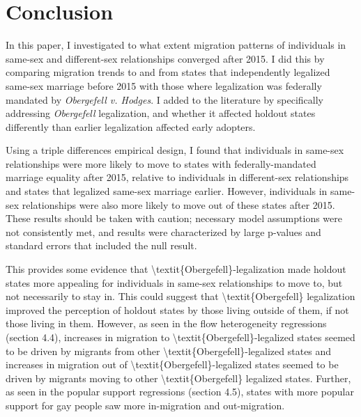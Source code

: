 \documentclass[12pt,letterpaper]{article}
\begin{document}
\FloatBarrier %
\section{Conclusion}

In this paper, I investigated to what extent migration patterns of individuals in same-sex and different-sex relationships converged after 2015. I did this by comparing migration trends to and from states that independently legalized same-sex marriage before 2015 with those where legalization was federally mandated by \textit{Obergefell v. Hodges}. I added to the literature by specifically addressing \textit{Obergefell} legalization, and whether it affected holdout states differently than earlier legalization affected early adopters.

Using a triple differences empirical design, I found that individuals in same-sex relationships were more likely to move to states with federally-mandated marriage equality after 2015, relative to individuals in different-sex relationships and states that legalized same-sex marriage earlier. However, individuals in same-sex relationships were also more likely to move out of these states after 2015. These results should be taken with caution; necessary model assumptions were not consistently met, and results were characterized by large p-values and standard errors that included the null result.

This provides some evidence that \textbackslash{}textit\{Obergefell\}-legalization made holdout states more appealing for individuals in same-sex relationships to move to, but not necessarily to stay in. This could suggest that \textbackslash{}textit\{Obergefell\} legalization improved the perception of holdout states by those living outside of them, if not those living in them. However, as seen in the flow heterogeneity regressions (section 4.4), increases in migration to \textbackslash{}textit\{Obergefell\}-legalized states seemed to be driven by migrants from other \textbackslash{}textit\{Obergefell\}-legalized states and increases in migration out of \textbackslash{}textit\{Obergefell\}-legalized states seemed to be driven by migrants moving to other \textbackslash{}textit\{Obergefell\} legalized states. Further, as seen in the popular support regressions (section 4.5), states with more popular support for gay people saw more in-migration and out-migration.
\end{document}
